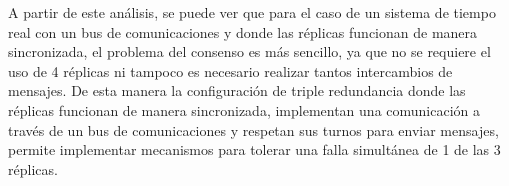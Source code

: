 A partir de este análisis, se puede ver que para el caso de un sistema de tiempo real con un bus de comunicaciones y donde las réplicas funcionan de manera sincronizada, el problema del consenso es más sencillo, ya que no se requiere el uso de 4 réplicas ni tampoco es necesario realizar tantos intercambios de mensajes. 
De esta manera la configuración de triple redundancia donde las réplicas funcionan de manera sincronizada, implementan una comunicación a través de un bus de comunicaciones y respetan sus turnos para enviar mensajes, permite implementar mecanismos para tolerar una falla simultánea de 1 de las 3 réplicas.





